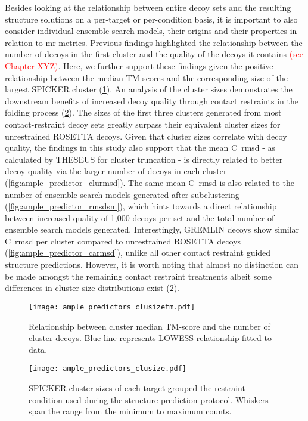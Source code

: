 Besides looking at the relationship between entire decoy sets and the resulting structure solutions on a per-target or per-condition basis, it is important to also consider individual ensemble search models, their origins and their properties in relation to \gls{mr} metrics. Previous findings highlighted the relationship between the number of decoys in the first cluster and the quality of the decoys it contains \textcolor{red}{(see Chapter XYZ)}. Here, we further support these findings given the positive relationship between the median TM-scores and the corresponding size of the largest SPICKER cluster (\cref{fig:ample_predictor_clusizetm}). An analysis of the cluster sizes demonstrates the downstream benefits of increased decoy quality through contact restraints in the folding process (\cref{fig:ample_predictor_clusize}). The sizes of the first three clusters generated from most contact-restraint decoy sets greatly surpass their equivalent cluster sizes for unrestrained ROSETTA decoys. Given that cluster sizes correlate with decoy quality, the findings in this study also support that the mean C\textalpha\ \gls{rmsd} - as calculated by THESEUS for cluster truncation - is directly related to better decoy quality via the larger number of decoys in each cluster (\cref{fig:ample_predictor_clurmsd}). The same mean C\textalpha\ \gls{rmsd} is also related to the number of ensemble search models generated after subclustering (\cref{fig:ample_predictor_rmsdsm}), which hints towards a direct relationship between increased quality of 1,000 decoys per set and the total number of ensemble search models generated. Interestingly, GREMLIN decoys show similar C\textalpha\ \gls{rmsd} per cluster compared to unrestrained ROSETTA decoys (\cref{fig:ample_predictor_carmsd}), unlike all other contact restraint guided structure predictions. However, it is worth noting that almost no distinction can be made amongst the remaining contact restraint treatments albeit some differences in cluster size distributions exist (\cref{fig:ample_predictor_clusize}).

\begin{figure}[H]
    \centering
    \texttt{[image: ample\_predictors\_clusizetm.pdf]}
    \caption{Relationship between cluster median TM-score and the number of cluster decoys. Blue line represents LOWESS relationship fitted to data.}
    \label{fig:ample_predictor_clusizetm}
\end{figure}

\begin{figure}[H]
    \centering
    \texttt{[image: ample\_predictors\_clusize.pdf]}
    \caption{SPICKER cluster sizes of each target grouped the restraint condition used during the structure prediction protocol. Whiskers span the range from the minimum to maximum counts.}
    \label{fig:ample_predictor_clusize}
\end{figure}

